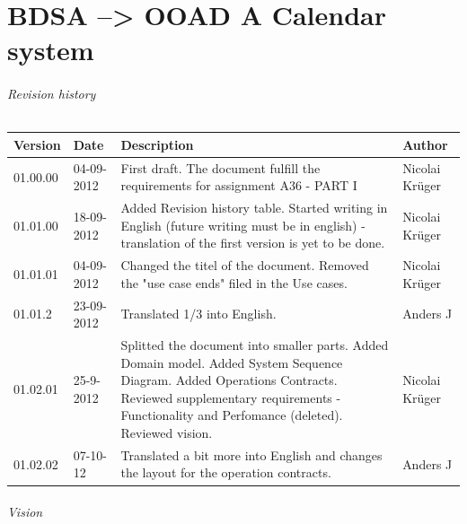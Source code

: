 \documentclass{article}
\begin{document}
  
  \part*{BDSA --> OOAD \linebreak A Calendar system}
  
  \paragraph{Revision history} \mbox{}  
  
  \begin{table}[ht]
    \begin{tabular}{|p{35pt}|p{50pt}|p{150pt}|p{75pt}|}
        \hline
        Version & Date &
        Description & 
        Author         
        \\ \hline
        01.00.00 & 04-09-2012 & 
        First draft. The document fulfill the requirements for assignment A36 - PART I &
        Nicolai Krüger 
        \\ \hline        
        01.01.00 & 18-09-2012 & 
        Added Revision history table. Started writing in English (future writing must be in english) - translation of the first version is yet to be done. & 
        Nicolai Krüger              
        \\ \hline
        01.01.01 & 04-09-2012 &
        Changed the titel of the document. \linebreak
        Removed the "use case ends" filed in the Use cases. &
        Nicolai Krüger
        \\ \hline
        01.01.2 & 23-09-2012 & 
        Translated 1/3 into English. &
        Anders J
        \\ \hline
        01.02.01 & 25-9-2012 &
        Splitted the document into smaller parts.
        Added Domain model.
        Added System Sequence Diagram.
        Added Operations Contracts.
        Reviewed supplementary requirements - Functionality and Perfomance (deleted).
        Reviewed vision. &
        Nicolai Krüger
        \\ \hline
        01.02.02 & 07-10-12 & 
        Translated a bit more into English and changes the layout for the operation contracts. &
        Anders J
        \\ \hline
    \end{tabular}
\end{table}
  
  \paragraph{Vision} \mbox{} 
  
\end{document}
